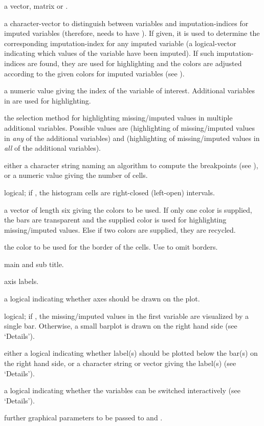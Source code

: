 \begin{Arguments}
\begin{ldescription}
\item[\code{x}] a vector, matrix or .
\item[\code{delimiter}] a character-vector to distinguish between variables
and imputation-indices for imputed variables (therefore,  needs
to have ). If given, it is used to determine the
corresponding imputation-index for any imputed variable (a logical-vector
indicating which values of the variable have been imputed). If such
imputation-indices are found, they are used for highlighting and the
colors are adjusted	according to the given colors for imputed variables
(see ).
\item[\code{pos}] a numeric value giving the index of the variable of 
interest.  Additional variables in  are used for 
highlighting.
\item[\code{selection}] the selection method for highlighting missing/imputed values 
in multiple additional variables.  Possible values are  
(highlighting of missing/imputed values in \emph{any} of the additional 
variables) and  (highlighting of missing/imputed values in 
\emph{all} of the additional variables).
\item[\code{breaks}] either a character string naming an algorithm to compute 
the breakpoints (see ), or a numeric value giving 
the number of cells.
\item[\code{right}] logical; if , the histogram cells are 
right-closed (left-open) intervals.
\item[\code{col}] a vector of length six giving the colors to be used. If 
only one color is supplied, the bars are transparent and the 
supplied color is used for highlighting missing/imputed values.
Else if two colors are supplied, they are recycled.
\item[\code{border}] the color to be used for the border of the cells. 
Use  to omit borders.
\item[\code{main, sub}] main and sub title.
\item[\code{xlab, ylab}] axis labels.
\item[\code{axes}] a logical indicating whether axes should be drawn 
on the plot.
\item[\code{only.miss}] logical; if , the missing/imputed values in the first 
variable are visualized by a single bar.  Otherwise, a small barplot 
is drawn on the right hand side (see `Details').
\item[\code{miss.labels}] either a logical indicating whether label(s) should 
be plotted below the bar(s) on the right hand side, or a character 
string or vector giving the label(s) (see `Details').
\item[\code{interactive}] a logical indicating whether the variables can be 
switched interactively (see `Details').
\item[\code{...}] further graphical parameters to be passed to 
 and .
\end{ldescription}
\end{Arguments}
